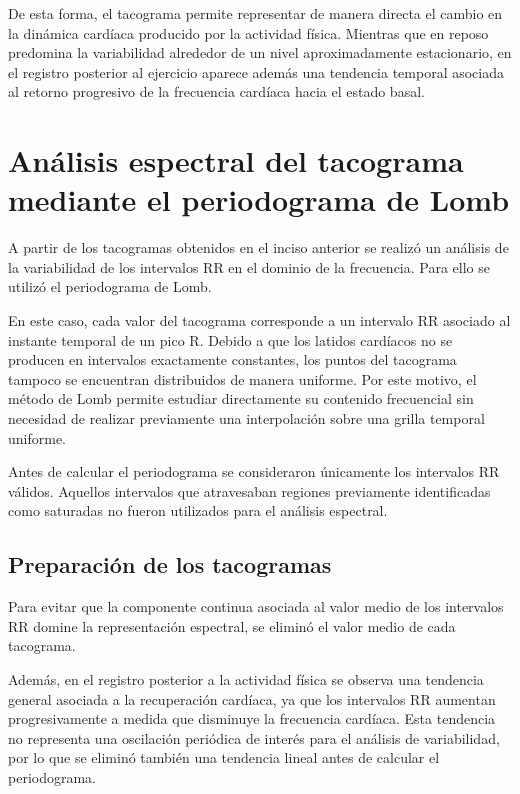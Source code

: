 \documentclass[12pt,a4paper]{article}
\begin{document}
De esta forma, el tacograma permite representar de manera directa el cambio en
la dinámica cardíaca producido por la actividad física. Mientras que en reposo
predomina la variabilidad alrededor de un nivel aproximadamente estacionario,
en el registro posterior al ejercicio aparece además una tendencia temporal
asociada al retorno progresivo de la frecuencia cardíaca hacia el estado basal.


\section{Análisis espectral del tacograma mediante el periodograma de Lomb}

A partir de los tacogramas obtenidos en el inciso anterior se realizó un análisis
de la variabilidad de los intervalos RR en el dominio de la frecuencia. Para
ello se utilizó el periodograma de Lomb.

En este caso, cada valor del tacograma corresponde a un intervalo RR asociado
al instante temporal de un pico R. Debido a que los latidos cardíacos no se
producen en intervalos exactamente constantes, los puntos del tacograma tampoco
se encuentran distribuidos de manera uniforme. Por este motivo, el método de
Lomb permite estudiar directamente su contenido frecuencial sin necesidad de
realizar previamente una interpolación sobre una grilla temporal uniforme.

Antes de calcular el periodograma se consideraron únicamente los intervalos RR
válidos. Aquellos intervalos que atravesaban regiones previamente identificadas
como saturadas no fueron utilizados para el análisis espectral.

\subsection{Preparación de los tacogramas}

Para evitar que la componente continua asociada al valor medio de los intervalos
RR domine la representación espectral, se eliminó el valor medio de cada
tacograma.

Además, en el registro posterior a la actividad física se observa una tendencia
general asociada a la recuperación cardíaca, ya que los intervalos RR aumentan
progresivamente a medida que disminuye la frecuencia cardíaca. Esta tendencia
no representa una oscilación periódica de interés para el análisis de
variabilidad, por lo que se eliminó también una tendencia lineal antes de
calcular el periodograma.
\end{document}
